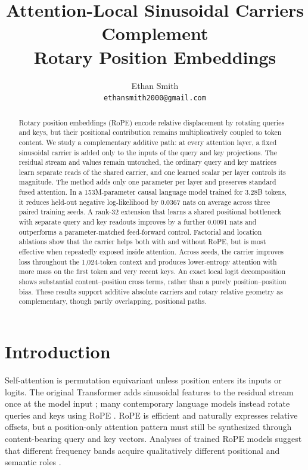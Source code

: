 \documentclass{article}
\title{Attention-Local Sinusoidal Carriers Complement\\
Rotary Position Embeddings}
\author{%
Ethan Smith \\
\texttt{ethansmith2000@gmail.com}
}
\begin{document}
\maketitle

\begin{abstract}
Rotary position embeddings (RoPE) encode relative displacement by rotating
queries and keys, but their positional contribution remains multiplicatively
coupled to token content. We study a complementary additive path: at every
attention layer, a fixed sinusoidal carrier is added only to the inputs of the
query and key projections. The residual stream and values remain untouched,
the ordinary query and key matrices learn separate reads of the shared
carrier, and one learned scalar per layer controls its magnitude. The method
adds only one parameter per layer and preserves standard fused attention. In
a 153M-parameter causal language model trained for 3.28B tokens, it reduces
held-out negative log-likelihood by 0.0367 nats on average across three paired
training seeds. A rank-32 extension that learns a shared positional bottleneck
with separate query and key readouts improves by a further 0.0091 nats and
outperforms a parameter-matched feed-forward control. Factorial and location
ablations show that the carrier helps both with and without RoPE, but is most
effective when repeatedly exposed inside attention. Across seeds, the carrier
improves loss throughout the 1,024-token context and produces lower-entropy
attention with more mass on the first token and very recent keys. An exact
local logit decomposition shows substantial content--position cross terms,
rather than a purely position--position bias. These results support additive
absolute carriers and rotary relative geometry as complementary, though
partly overlapping, positional paths.
\end{abstract}

\section{Introduction}

Self-attention is permutation equivariant unless position enters its inputs or
logits. The original Transformer adds sinusoidal features to the residual
stream once at the model input \citep{vaswani2017attention}; many contemporary
language models instead rotate queries and keys using RoPE
\citep{su2024roformer}. RoPE is efficient and naturally expresses relative
offsets, but a position-only attention pattern must still be synthesized
through content-bearing query and key vectors. Analyses of trained RoPE models
suggest that different frequency bands acquire qualitatively different
positional and semantic roles \citep{barbero2025round}.
\end{document}
